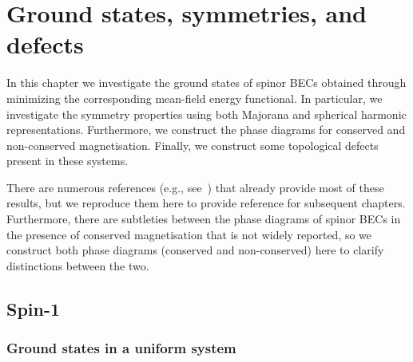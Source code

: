 \chapter{Ground states, symmetries, and defects}
In this chapter we investigate the ground states of spinor BECs obtained through
minimizing the corresponding mean-field energy functional.
In particular, we investigate the symmetry properties using both Majorana and
spherical harmonic representations.
Furthermore, we construct the phase diagrams for conserved and non-conserved
magnetisation.
Finally, we construct some topological defects present in these systems.

There are numerous references (e.g., see~\cite{Ciobanu2000, Zhang2003,
Kawaguchi2012, StamperKurn2013}) that already provide most of these results,
but we reproduce them here to provide reference for subsequent chapters.
Furthermore, there are subtleties between the phase diagrams of spinor BECs
in the presence of conserved magnetisation that is not widely reported, so we
construct both phase diagrams (conserved and non-conserved) here to clarify
distinctions between the two.


\section{Spin-1}

\subsection{Ground states in a uniform system}

